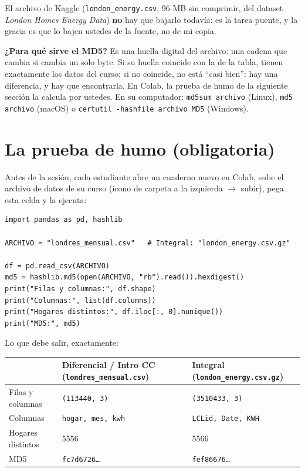 \documentclass[12pt,letterpaper]{article}
\begin{document}
El archivo de Kaggle (\texttt{london\_energy.csv}, 96 MB sin comprimir, del dataset \emph{London Homes Energy Data}) \textbf{no} hay que bajarlo todavía: es la tarea puente, y la gracia es que lo bajen ustedes de la fuente, no de mi copia.

\begin{cajareal}
\textbf{¿Para qué sirve el MD5?} Es una huella digital del archivo: una cadena que cambia si cambia un solo byte. Si su huella coincide con la de la tabla, tienen exactamente los datos del curso; si no coincide, no está ``casi bien'': hay una diferencia, y hay que encontrarla. En Colab, la prueba de humo de la siguiente sección la calcula por ustedes. En su computador: \texttt{md5sum archivo} (Linux), \texttt{md5 archivo} (macOS) o \texttt{certutil -hashfile archivo MD5} (Windows).
\end{cajareal}

\section{La prueba de humo (obligatoria)}
Antes de la sesión, cada estudiante abre un cuaderno nuevo en Colab, sube el archivo de datos de su curso (ícono de carpeta a la izquierda $\to$ subir), pega esta celda y la ejecuta:

\begin{lstlisting}
import pandas as pd, hashlib

ARCHIVO = "londres_mensual.csv"   # Integral: "london_energy.csv.gz"

df = pd.read_csv(ARCHIVO)
md5 = hashlib.md5(open(ARCHIVO, "rb").read()).hexdigest()
print("Filas y columnas:", df.shape)
print("Columnas:", list(df.columns))
print("Hogares distintos:", df.iloc[:, 0].nunique())
print("MD5:", md5)
\end{lstlisting}

Lo que debe salir, exactamente:

\begin{center}
\footnotesize
\begin{tabular}{lll}
\toprule
 & \textbf{Diferencial / Intro CC} (\texttt{londres\_mensual.csv}) & \textbf{Integral} (\texttt{london\_energy.csv.gz})\\
\midrule
Filas y columnas & \texttt{(113440, 3)} & \texttt{(3510433, 3)}\\
Columnas & \texttt{hogar, mes, kwh} & \texttt{LCLid, Date, KWH}\\
Hogares distintos & 5556 & 5566\\
MD5 & \texttt{fc7d6726\ldots} & \texttt{fef86676\ldots}\\
\bottomrule
\end{tabular}
\end{center}
\end{document}
